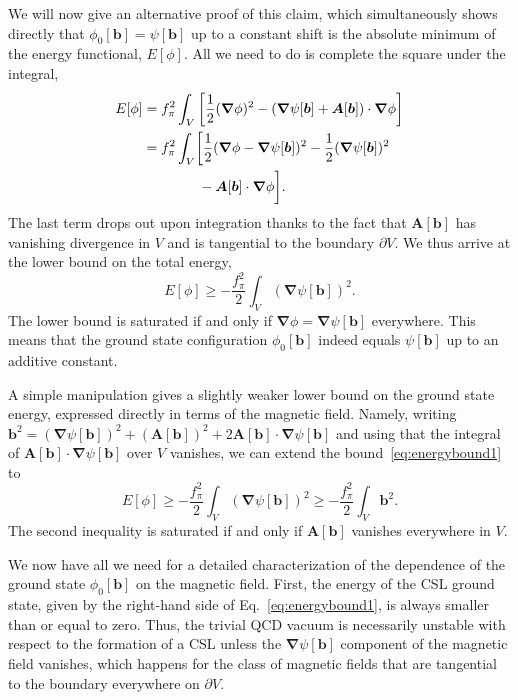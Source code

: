 \documentclass[pdflatex,iicol,sn-mathphys-num]{sn-jnl}
\let\p=\phi
\let\de=\partial
\newcommand{\vek}[1]{\bm{#1}}%
\newcommand{\grad}{\vek\nabla}%
\newcommand{\bmag}{b}%
\begin{document}
We will now give an alternative proof of this claim, which simultaneously shows directly that $\p_0[\vek\bmag]=\psi[\vek\bmag]$ up to a constant shift is the absolute minimum of the energy functional, $E[\p]$. All we need to do is complete the square under the integral,
\begin{align}
\notag
E[\p]&=f_\pi^2\int_V\left[\frac{1}{2}(\grad\p)^2-(\grad\psi[\vek\bmag]+\vek A[\vek\bmag])\cdot\grad\p\right]\\
\notag
&=f_\pi^2\int_V\biggl[\frac{1}{2}(\grad\p-\grad\psi[\vek\bmag])^2-\frac{1}{2}(\grad\psi[\vek\bmag])^2\\
&\qquad\qquad-\vek A[\vek\bmag]\cdot\grad\p\biggr].
\end{align}
The last term drops out upon integration thanks to the fact that $\vek A[\vek\bmag]$ has vanishing divergence in $V$ and is tangential to the boundary $\de V$. We thus arrive at the lower bound on the total energy,
\begin{equation}
E[\p]\geq-\frac{f_\pi^2}{2}\int_V(\grad\psi[\vek\bmag])^2.
\label{eq:energybound1}
\end{equation}
The lower bound is saturated if and only if $\grad\p=\grad\psi[\vek\bmag]$ everywhere. This means that the ground state configuration $\p_0[\vek\bmag]$ indeed equals $\psi[\vek\bmag]$ up to an additive constant.

A simple manipulation gives a slightly weaker lower bound on the ground state energy, expressed directly in terms of the magnetic field. Namely, writing $\vek\bmag^2=(\grad\psi[\vek\bmag])^2+(\vek A[\vek\bmag])^2+2\vek A[\vek\bmag]\cdot\grad\psi[\vek\bmag]$ and using that the integral of $\vek A[\vek\bmag]\cdot\grad\psi[\vek\bmag]$ over $V$ vanishes, we can extend the bound~\eqref{eq:energybound1} to
\begin{equation}
E[\p]\geq-\frac{f_\pi^2}{2}\int_V(\grad\psi[\vek\bmag])^2\geq-\frac{f_\pi^2}{2}\int_V\vek\bmag^2.
\label{eq:energybound2}
\end{equation}
The second inequality is saturated if and only if $\vek A[\vek\bmag]$ vanishes everywhere in $V$.

We now have all we need for a detailed characterization of the dependence of the ground state $\p_0[\vek\bmag]$ on the magnetic field. First, the energy of the CSL ground state, given by the right-hand side of Eq.~\eqref{eq:energybound1}, is always smaller than or equal to zero. Thus, the trivial QCD vacuum is necessarily unstable with respect to the formation of a CSL unless the $\grad\psi[\vek\bmag]$ component of the magnetic field vanishes, which happens for the class of magnetic fields that are tangential to the boundary everywhere on $\de V$.
\end{document}
